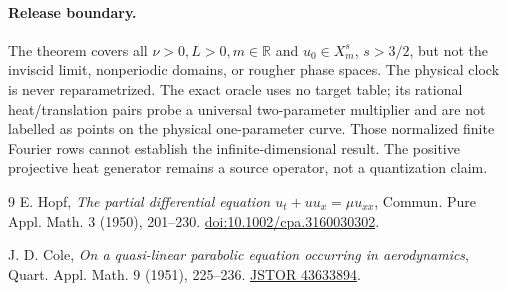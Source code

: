\documentclass[8pt]{extarticle}
\begin{document}
\paragraph{Release boundary.}
The theorem covers all \(\nu>0,L>0,m\in\mathbb R\) and \(u_0\in X_m^s\),
\(s>3/2\), but not the inviscid limit, nonperiodic domains, or rougher phase spaces.
The physical clock is never reparametrized. The exact oracle uses no target table;
its rational heat/translation pairs probe a universal two-parameter multiplier and
are not labelled as points on the physical one-parameter curve. Those normalized
finite Fourier rows cannot establish the infinite-dimensional result.
The positive projective heat generator remains a source operator, not a
quantization claim.
\fi

\begin{thebibliography}{9}
E. Hopf, \emph{The partial differential equation \(u_t+uu_x=\mu u_{xx}\)},
Commun. Pure Appl. Math. 3 (1950), 201--230.
\href{https://doi.org/10.1002/cpa.3160030302}{doi:10.1002/cpa.3160030302}.

J. D. Cole, \emph{On a quasi-linear parabolic equation occurring in aerodynamics},
Quart. Appl. Math. 9 (1951), 225--236.
\href{https://www.jstor.org/stable/43633894}{JSTOR 43633894}.
\end{thebibliography}
\end{document}
